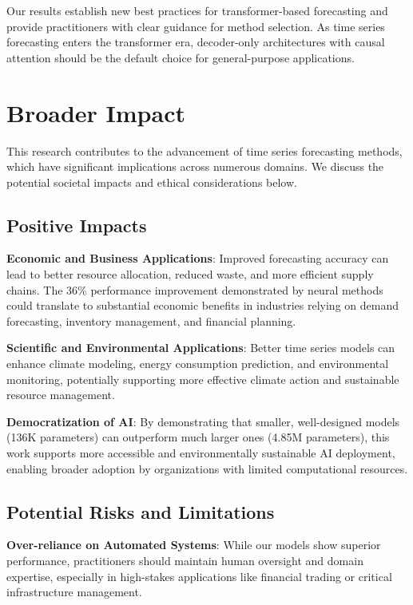 \documentclass[11pt]{article}
\begin{document}
Our results establish new best practices for transformer-based forecasting and provide practitioners with clear guidance for method selection. As time series forecasting enters the transformer era, decoder-only architectures with causal attention should be the default choice for general-purpose applications.

\section*{Broader Impact}

This research contributes to the advancement of time series forecasting methods, which have significant implications across numerous domains. We discuss the potential societal impacts and ethical considerations below.

\subsection*{Positive Impacts}

\textbf{Economic and Business Applications}: Improved forecasting accuracy can lead to better resource allocation, reduced waste, and more efficient supply chains. The 36\% performance improvement demonstrated by neural methods could translate to substantial economic benefits in industries relying on demand forecasting, inventory management, and financial planning.

\textbf{Scientific and Environmental Applications}: Better time series models can enhance climate modeling, energy consumption prediction, and environmental monitoring, potentially supporting more effective climate action and sustainable resource management.

\textbf{Democratization of AI}: By demonstrating that smaller, well-designed models (136K parameters) can outperform much larger ones (4.85M parameters), this work supports more accessible and environmentally sustainable AI deployment, enabling broader adoption by organizations with limited computational resources.

\subsection*{Potential Risks and Limitations}

\textbf{Over-reliance on Automated Systems}: While our models show superior performance, practitioners should maintain human oversight and domain expertise, especially in high-stakes applications like financial trading or critical infrastructure management.
\end{document}

